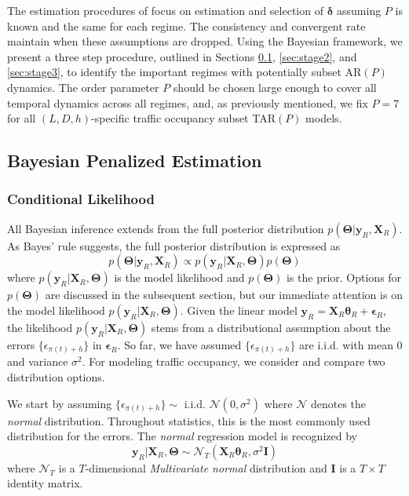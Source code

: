 The estimation procedures of \cite{Chan2015,Chan2017} focus on estimation and selection of $\bm{\delta}$ assuming $P$ is known and the same for each regime. The consistency and convergent rate maintain when these assumptions are dropped. Using the Bayesian framework, we present a three step procedure, outlined in Sections \ref{sec:stage1}, \ref{sec:stage2}, and \ref{sec:stage3}, to identify the important regimes with potentially subset AR$(P)$ dynamics. The order parameter $P$ should be chosen large enough to cover all temporal dynamics across all regimes, and, as previously mentioned, we fix $P=7$ for all $(L,D,h)$-specific traffic occupancy subset TAR$(P)$ models.

\subsection{Bayesian Penalized Estimation}
\label{sec:stage1}

\subsubsection{Conditional Likelihood}
All Bayesian inference extends from the full posterior distribution $p(\bm{\Theta}|\bm{y}_R,\bm{X}_R)$. As Bayes' rule suggests, the full posterior distribution is expressed as
\begin{equation}
\label{eq:fullpost}
p(\bm{\Theta}|\bm{y}_R,\bm{X}_R) \propto p(\bm{y}_R|\bm{X}_R,\bm{\Theta})p(\bm{\Theta})
\end{equation}
where $p(\bm{y}_R|\bm{X}_R,\bm{\Theta})$ is the model likelihood and $p(\bm{\Theta})$ is the prior. Options for $p(\bm{\Theta})$ are discussed in the subsequent section, but our immediate attention is on the model likelihood $p(\bm{y}_R|\bm{X}_R,\bm{\Theta})$. Given the linear model $\bm{y}_R=\bm{X}_R\bm{\theta}_R+\bm{\epsilon}_R$, the likelihood $p(\bm{y}_R|\bm{X}_R,\bm{\Theta})$ stems from a distributional assumption about the errors $\{\epsilon_{\pi(t)+h}\}$ in $\bm{\epsilon}_R$. So far, we have assumed $\{\epsilon_{\pi(t)+h}\}$ are i.i.d. with mean $0$ and variance $\sigma^2$. For modeling traffic occupancy, we consider and compare two distribution options.

We start by assuming $\{\epsilon_{\pi(t)+h}\} \sim \textrm{ i.i.d. }\mathcal{N}(0,\sigma^2)$ where $\mathcal{N}$ denotes the \textit{normal} distribution. Throughout statistics, this is the most commonly used distribution for the errors. The \textit{normal} regression model is recognized by 
\begin{equation}
\label{eq:normalmod}
\bm{y}_R|\bm{X}_R,\bm{\Theta}\sim \mathcal{N}_T(\bm{X}_R\bm{\theta}_R,\sigma^2\bm{I})
\end{equation}
where $\mathcal{N}_T$ is a $T$-dimensional \textit{Multivariate normal} distribution and $\bm{I}$ is a $T\times T$ identity matrix.

